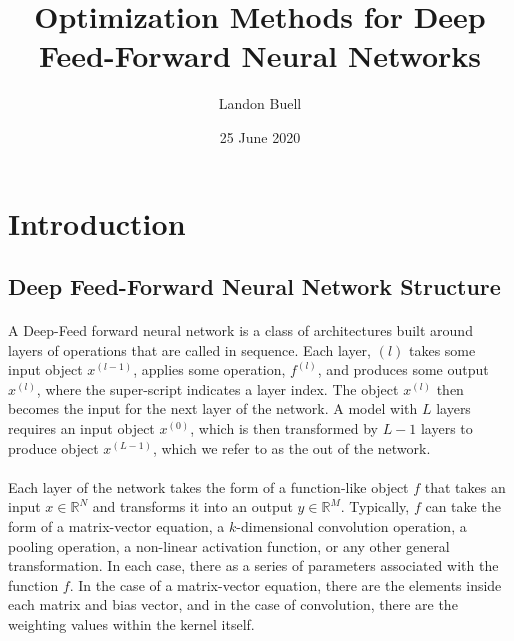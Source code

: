 \documentclass[12pt,letterpaper]{article}
\begin{document}

\title{Optimization Methods for Deep Feed-Forward Neural Networks}
\author{Landon Buell}
\date{25 June 2020}
\maketitle


\section{Introduction}

\subsection{Deep Feed-Forward Neural Network Structure}

\paragraph*{}A Deep-Feed forward neural network is a class of architectures built around layers of operations that are called in sequence. Each layer, $(l)$ takes some input object $x^{(l-1)}$, applies some operation, $f^{(l)}$, and produces some output $x^{(l)}$, where the super-script indicates a layer index. The object $x^{(l)}$ then becomes the input for the next layer of the network. A model with $L$ layers requires an input object $x^{(0)}$, which is then transformed by $L-1$ layers to produce object $x^{(L-1)}$, which we refer to as the out of the network.

\paragraph*{}Each layer of the network takes the form of a function-like object $f$ that takes an input $x \in \mathbb{R}^N$ and transforms it into an output $y \in \mathbb{R}^M$. Typically, $f$ can take the form of a matrix-vector equation, a $k$-dimensional convolution operation, a pooling operation, a non-linear activation function, or any other general transformation. In each case, there as a series of parameters associated with the function $f$. In the case of a matrix-vector equation, there are the elements inside each matrix and bias vector, and in the case of convolution, there are the weighting values within the kernel itself. 
\end{document}
